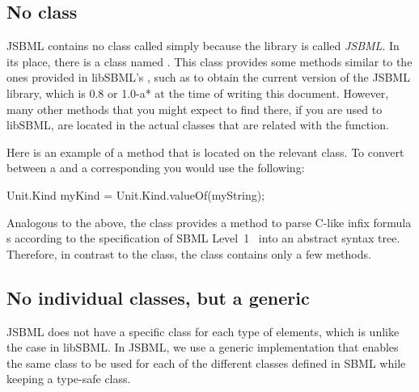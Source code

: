 \subsection{No class }

JSBML contains no class called  simply because the library
is called \emph{JSBML}.  %
In its place, there is a class named .
 This class provides some methods similar
to the ones provided in libSBML's , such as
to obtain the current version of the JSBML library, which is 0.8 or 1.0-a* at the
time of writing this document. However, many other methods that you might
expect to find there, if you are used to libSBML, are located in the actual
classes that are related with the function. 

Here is an example of a method that is located on the relevant class.  To
convert between a \String {}%
and a corresponding 
%
you would use the following:

\begin{example}[style=java,
  title={Converting a string to a unit kind in JSBML.}]
Unit.Kind myKind = Unit.Kind.valueOf(myString);
\end{example}

Analogous to the above, the \ASTNode class provides a method to parse
C-like infix formula {\String}s according to the specification of SBML
Level~1~\citep{Hucka2003} into an abstract syntax
tree. Therefore, in contrast to the  class, the class
 contains only a few methods.


\subsection{No individual  classes, but a generic }


JSBML does not have a specific 
class for each type of \SBase elements, which is unlike the case in
libSBML. In JSBML, we use a generic implementation  that enables the same class to be used for each of the different
 classes defined in SBML while keeping a type-safe class.

